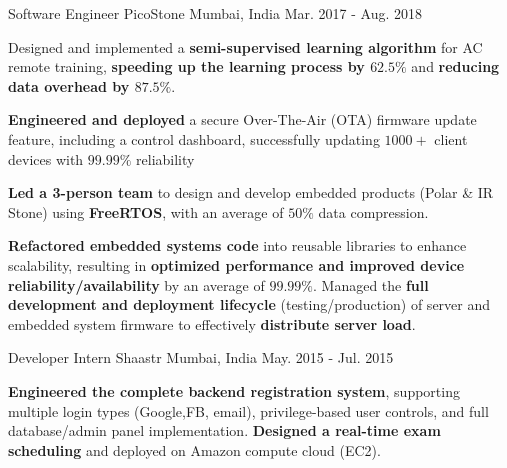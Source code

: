 \begin{cventries}
	\cventry
	{Software Engineer} %
	{PicoStone} %
	{Mumbai, India} %
	{Mar. 2017 - Aug. 2018} %
	{ \begin{cvitems} %
	\item {Designed and implemented a \textbf{semi-supervised learning algorithm} for AC remote training, \textbf{speeding up the learning process by $62.5\%$} and \textbf{reducing data overhead by $87.5\%$}.} %
      \item{\textbf{Engineered and deployed} a secure Over-The-Air (OTA) firmware update feature, including a control dashboard, successfully updating $1000+$ client devices with $99.99\%$ reliability}
	  \item {\textbf{Led a 3-person team} to design and develop embedded products (Polar \& IR Stone) using \textbf{FreeRTOS}, with an average of $50\%$ data compression.}  %
      \item {\textbf{Refactored embedded systems code} into reusable libraries to enhance scalability, resulting in \textbf{optimized performance and improved device reliability/availability} by an average of $99.99\%$. Managed the \textbf{full development and deployment lifecycle} (testing/production) of server and embedded system firmware to effectively \textbf{distribute server load}.}  %
     	\item[]
	\end{cvitems}
  }


	\cventry
	{Developer Intern} %
	{Shaastr } %
	{Mumbai, India} %
	{May. 2015 - Jul. 2015} %
	{
		\begin{cvitems} %
			\item {\textbf{Engineered the complete backend registration system}, supporting multiple login types (Google,FB, email), privilege-based user controls, and full database/admin panel implementation. \textbf{Designed a real-time exam scheduling} and deployed on Amazon compute cloud (EC2).}
		\item[]
		\end{cvitems}
	}


\end{cventries}
